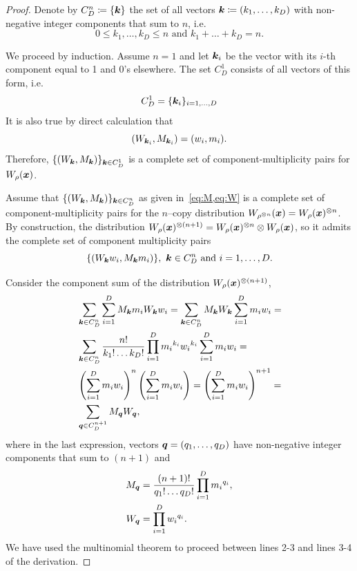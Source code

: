 \documentclass[pra,
aps,
twocolumn,
superscriptaddress,
groupedaddress,
nofootinbib,
reprint
]{revtex4-1}
\begin{document}
\begin{proof}
	Denote by $C_D^n \coloneqq \{\bm{k}\}$ the set of all vectors $\bm{k} \coloneqq (k_1, \dots, k_D)$ with non-negative integer components that sum to $n$, i.e.
	\begin{equation*}
	0 \leq k_1, \dots, k_D \leq n \text{ and } k_1 + \dots + k_D = n.
	\end{equation*}
	
	We proceed by induction.	
	Assume $n = 1$ and let $\bm{k}_i$ be the vector with its $i$-th component equal to 1 and 0's elsewhere.
	The set $C_D^1$ consists of all vectors of this form, i.e. 
\begin{equation*}
	C_D^1 = \{ \bm{k}_i \}_{i=1,\dots,D}
\end{equation*}
	It is also true by direct calculation that
\begin{equation*}
	\left( W_{\bm{k}_i}, M_{\bm{k}_i} \right) = (w_i, m_i).
\end{equation*}
Therefore, $\{ (W_{\bm{k}}, M_{\bm{k}}) \}_{\bm{k} \in C_D^1}$ is a complete set of component-multiplicity pairs for $W_\rho(\boldsymbol{x})$.

	Assume that $\{(W_{\bm{k}}, M_{\bm{k}})\}_{\bm{k} \in C_D^n}$ as given in~\cref{eq:M,eq:W} is a complete set of component-multiplicity pairs for the $n$--copy distribution $W_{\rho^{\otimes n}}(\bm{x}) = W_{\rho}(\bm{x})^{\otimes n}$.
	By construction, the distribution $W_{\rho}(\bm{x})^{\otimes (n+1)} = W_{\rho}(\bm{x})^{\otimes n} \otimes W_{\rho}(\bm{x})$, so it admits the complete set of component multiplicity pairs
\begin{equation}
	\{(W_{\bm{k}} w_i, M_{\bm{k}} m_i)\},\ \bm{k} \in C_D^n \text{ and } i=1,\dots,D.
\end{equation}
	
	Consider the component sum of the distribution $W_{\rho}(\bm{x})^{\otimes (n+1)}$,
\begin{align*}
	&\sum_{\bm{k} \in C_D^n}\sum_{i=1}^D M_{\bm{k}} m_i W_{\bm{k}} w_i = \sum_{\bm{k} \in C_D^n} M_{\bm{k}}W_{\bm{k}} \sum_{i=1}^D m_i w_i =\\
	&\sum_{\bm{k} \in C_D^n} \frac{n!}{k_1!\dots k_D!} \prod\limits_{i=1}^D {m_i}^{k_i}{w_i}^{k_i} \sum_{i=1}^D m_i w_i =\\
	&\left( \sum_{i=1}^D m_i w_i \right)^n \left( \sum_{i=1}^D m_i w_i \right) = \left( \sum_{i=1}^D m_i w_i \right)^{n+1} =\\
	&\sum_{\bm{q} \in C_D^{n+1}} M_{\bm{q}}W_{\bm{q}},
\end{align*}
where in the last expression, vectors $\bm{q} = (q_1, \dots, q_D)$ have non-negative integer components that sum to $(n+1)$ and 
\begin{align*}
	M_{\bm{q}} &= \frac{(n+1)!}{q_1!\dots q_D!} \prod\limits_{i=1}^D {m_i}^{q_i},\\
	W_{\bm{q}} &= \prod\limits_{i=1}^D {w_i}^{q_i}.
\end{align*}
We have used the multinomial theorem to proceed between lines 2-3 and lines 3-4 of the derivation.


\end{proof}
\end{document}
